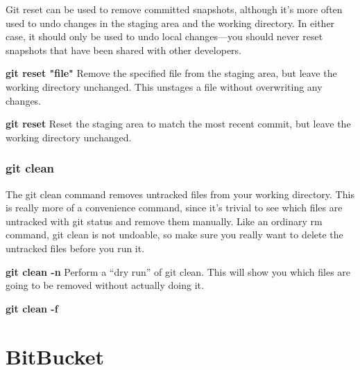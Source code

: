\documentclass{article}
\begin{document}
 Git reset can be used to remove committed snapshots, although it’s more often used to undo changes in the staging area and the working directory. In either case, it should only be used to undo local changes—you should never reset snapshots that have been shared with other developers.

\textbf{git reset "file"}
Remove the specified file from the staging area, but leave the working directory unchanged. This unstages a file without overwriting any changes.

\textbf{git reset}
Reset the staging area to match the most recent commit, but leave the working directory unchanged. 

\subsubsection{git clean}

The git clean command removes untracked files from your working directory. This is really more of a convenience command, since it’s trivial to see which files are untracked with git status and remove them manually. Like an ordinary rm command, git clean is not undoable, so make sure you really want to delete the untracked files before you run it.

\textbf{git clean -n}
Perform a “dry run” of git clean. This will show you which files are going to be removed without actually doing it.

\textbf{git clean -f}



\section{BitBucket}
\end{document}
